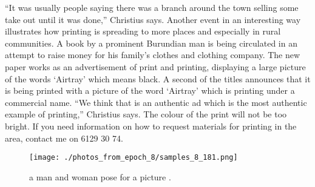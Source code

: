 \documentclass{article}%
\begin{document}
“It was usually people saying there was a branch around the town selling some take out until it was done,” Christius says.\newline%
Another event in an interesting way illustrates how printing is spreading to more places and especially in rural communities.\newline%
A book by a prominent Burundian man is being circulated in an attempt to raise money for his family’s clothes and clothing company.\newline%
The new paper works as an advertisement of print and printing, displaying a large picture of the words ‘Airtray’ which means black.\newline%
A second of the titles announces that it is being printed with a picture of the word ‘Airtray’ which is printing under a commercial name.\newline%
“We think that is an authentic ad which is the most authentic example of printing,” Christius says.\newline%
The colour of the print will not be too bright.\newline%
If you need information on how to request materials for printing in the area, contact me on 6129 30 74.\newline%

%


\begin{figure}[h!]%
\centering%
\texttt{[image: ./photos\_from\_epoch\_8/samples\_8\_181.png]}%
\caption{a man and woman pose for a picture .}%
\end{figure}

%
\end{document}
